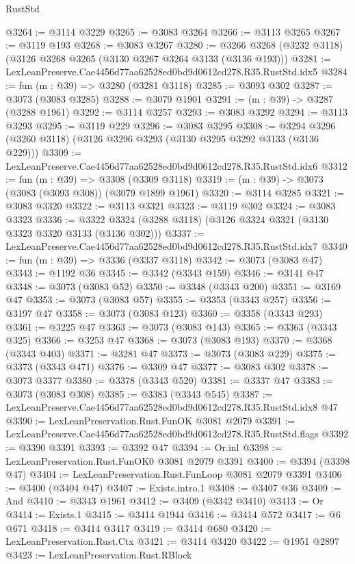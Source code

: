 \begin{lexlean}{RustStd}
\begin{coremodule}
@3264 := @3114 @3229
@3265 := @3083 @3264
@3266 := @3113 @3265
@3267 := @3119 @193
@3268 := @3083 @3267
@3280 := @3266 @3268 (@3232 @3118) (@3126 @3268 @3265 (@3130 @3267 @3264 @3133 (@3136 @193)))
@3281 := LexLeanPreserve.Cae4456d77aa62528ed0bd9d0612cd278.R35.RustStd.idx5
@3284 := fun (m : @39) => @3280 (@3281 @3118)
@3285 := @3093 @302
@3287 := @3073 (@3083 @3285)
@3288 := @3079 @1901
@3291 := (m : @39) -> @3287 (@3288 @1961)
@3292 := @3114 @3257
@3293 := @3083 @3292
@3294 := @3113 @3293
@3295 := @3119 @229
@3296 := @3083 @3295
@3308 := @3294 @3296 (@3260 @3118) (@3126 @3296 @3293 (@3130 @3295 @3292 @3133 (@3136 @229)))
@3309 := LexLeanPreserve.Cae4456d77aa62528ed0bd9d0612cd278.R35.RustStd.idx6
@3312 := fun (m : @39) => @3308 (@3309 @3118)
@3319 := (m : @39) -> @3073 (@3083 (@3093 @308)) (@3079 @1899 @1961)
@3320 := @3114 @3285
@3321 := @3083 @3320
@3322 := @3113 @3321
@3323 := @3119 @302
@3324 := @3083 @3323
@3336 := @3322 @3324 (@3288 @3118) (@3126 @3324 @3321 (@3130 @3323 @3320 @3133 (@3136 @302)))
@3337 := LexLeanPreserve.Cae4456d77aa62528ed0bd9d0612cd278.R35.RustStd.idx7
@3340 := fun (m : @39) => @3336 (@3337 @3118)
@3342 := @3073 (@3083 @47)
@3343 := @1192 @36
@3345 := @3342 (@3343 @159)
@3346 := @3141 @47
@3348 := @3073 (@3083 @52)
@3350 := @3348 (@3343 @200)
@3351 := @3169 @47
@3353 := @3073 (@3083 @57)
@3355 := @3353 (@3343 @257)
@3356 := @3197 @47
@3358 := @3073 (@3083 @123)
@3360 := @3358 (@3343 @293)
@3361 := @3225 @47
@3363 := @3073 (@3083 @143)
@3365 := @3363 (@3343 @325)
@3366 := @3253 @47
@3368 := @3073 (@3083 @193)
@3370 := @3368 (@3343 @403)
@3371 := @3281 @47
@3373 := @3073 (@3083 @229)
@3375 := @3373 (@3343 @471)
@3376 := @3309 @47
@3377 := @3083 @302
@3378 := @3073 @3377
@3380 := @3378 (@3343 @520)
@3381 := @3337 @47
@3383 := @3073 (@3083 @308)
@3385 := @3383 (@3343 @545)
@3387 := LexLeanPreserve.Cae4456d77aa62528ed0bd9d0612cd278.R35.RustStd.idx8 @47
@3390 := LexLeanPreservation.Rust.FunOK @3081 @2079
@3391 := LexLeanPreserve.Cae4456d77aa62528ed0bd9d0612cd278.R35.RustStd.flags
@3392 := @3390 @3391
@3393 := @3392 @47
@3394 := Or.inl
@3398 := LexLeanPreservation.Rust.FunOK0 @3081 @2079 @3391
@3400 := @3394 (@3398 @47)
@3404 := LexLeanPreservation.Rust.FunLoop @3081 @2079 @3391
@3406 := @3400 (@3404 @47)
@3407 := Exists.intro.{1}
@3408 := @3407 @36
@3409 := And
@3410 := @3343 @1961
@3412 := @3409 (@3342 @3410)
@3413 := Or
@3414 := Exists.{1}
@3415 := @3414 @1944
@3416 := @3414 @572
@3417 := @6 @671
@3418 := @3414 @3417
@3419 := @3414 @680
@3420 := LexLeanPreservation.Rust.Ctx
@3421 := @3414 @3420
@3422 := @1951 @2897
@3423 := LexLeanPreservation.Rust.RBlock

\end{coremodule}
\end{lexlean}
